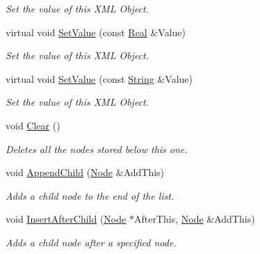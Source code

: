 \begin{DoxyCompactItemize}
\begin{DoxyCompactList}\small\item\em Set the value of this XML Object. \item\end{DoxyCompactList}\item 
virtual void \hyperlink{classphys_1_1xml_1_1Node_aa027762ec3820691560abee55ecc7695}{SetValue} (const \hyperlink{namespacephys_af7eb897198d265b8e868f45240230d5f}{Real} \&Value)
\begin{DoxyCompactList}\small\item\em Set the value of this XML Object. \item\end{DoxyCompactList}\item 
virtual void \hyperlink{classphys_1_1xml_1_1Node_a85b1938ff6672df596bc03beab81b19a}{SetValue} (const \hyperlink{namespacephys_aa03900411993de7fbfec4789bc1d392e}{String} \&Value)
\begin{DoxyCompactList}\small\item\em Set the value of this XML Object. \item\end{DoxyCompactList}\item 
void \hyperlink{classphys_1_1xml_1_1Node_ab7cb34bafbb749f0515434bd6e1b02cf}{Clear} ()
\begin{DoxyCompactList}\small\item\em Deletes all the nodes stored below this one. \item\end{DoxyCompactList}\item 
void \hyperlink{classphys_1_1xml_1_1Node_ae310c7a818a8cc9e907bd42c24eff94c}{AppendChild} (\hyperlink{classphys_1_1xml_1_1Node}{Node} \&AddThis)
\begin{DoxyCompactList}\small\item\em Adds a child node to the end of the list. \item\end{DoxyCompactList}\item 
void \hyperlink{classphys_1_1xml_1_1Node_a2aed3d1518d7aaf55dad72d7a51f31d2}{InsertAfterChild} (\hyperlink{classphys_1_1xml_1_1Node}{Node} $\ast$AfterThis, \hyperlink{classphys_1_1xml_1_1Node}{Node} \&AddThis)
\begin{DoxyCompactList}\small\item\em Adds a child node after a specified node. \item\end{DoxyCompactList}\item 

\end{DoxyCompactItemize}
